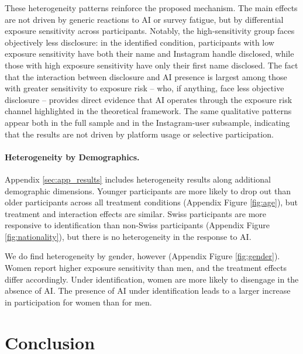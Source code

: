 \documentclass[12pt,notitlepage]{article}
\theoremstyle{plain}
\theoremstyle{plain}
\theoremstyle{definition}
\theoremstyle{definition}
\theoremstyle{assumption}
\theoremstyle{plain}
\theoremstyle{plain}
\theoremstyle{plain}
\theoremstyle{plain}
\theoremstyle{definition}%
\theoremstyle{plain}
\theoremstyle{plain}
\theoremstyle{plain}
\theoremstyle{plain}
\begin{document}
These heterogeneity patterns reinforce the proposed mechanism. The main effects are not driven by generic reactions to AI or survey fatigue, but by differential exposure sensitivity across participants. Notably, the high-sensitivity group faces objectively less disclosure: in the identified condition, participants with low exposure sensitivity have both their name and Instagram handle disclosed, while those with high exposure sensitivity have only their first name disclosed.  The fact that the interaction between disclosure and AI presence is largest among those with greater sensitivity to exposure risk -- who, if anything, face less objective disclosure -- provides direct evidence that AI operates through the exposure risk channel highlighted in the theoretical framework. The same qualitative patterns appear both in the full sample and in the Instagram-user subsample, indicating that the results are not driven by platform usage or selective participation.



\paragraph{Heterogeneity by Demographics.}

Appendix \ref{sec:app_results} includes heterogeneity results along additional demographic dimensions. Younger participants are more likely to drop out than older participants across all treatment conditions (Appendix Figure \ref{fig:age}), but treatment and interaction effects are similar. Swiss participants are more responsive to identification than non-Swiss participants (Appendix Figure \ref{fig:nationality}), but there is no heterogeneity in the response to AI.  

We do find heterogeneity by gender, however (Appendix Figure \ref{fig:gender}). Women report higher exposure sensitivity than men, and the treatment effects differ accordingly. Under identification, women are more likely to disengage in the absence of AI. The presence of AI under identification leads to a larger increase in participation for women than for men. 


\section{Conclusion}
\end{document}
